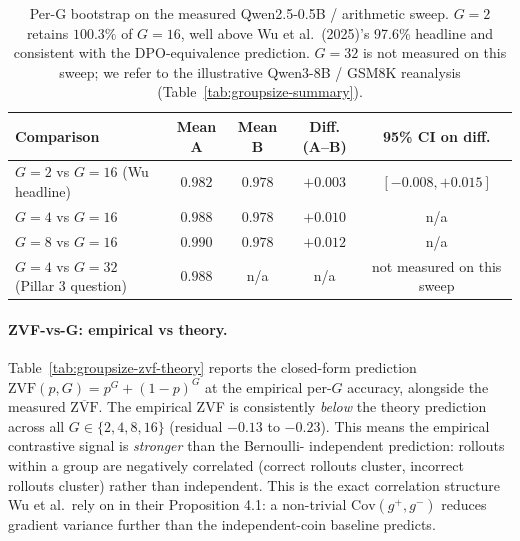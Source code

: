 \begin{table}[htbp]
\centering
\small
\begin{tabular}{lcccc}
\toprule
Comparison & Mean A & Mean B & Diff. (A--B) & 95\% CI on diff. \\
\midrule
$G{=}2$ vs $G{=}16$ (Wu headline)        & $0.982$ & $0.978$ & $+0.003$ & $[-0.008, +0.015]$ \\
$G{=}4$ vs $G{=}16$                      & $0.988$ & $0.978$ & $+0.010$ & n/a                \\
$G{=}8$ vs $G{=}16$                      & $0.990$ & $0.978$ & $+0.012$ & n/a                \\
$G{=}4$ vs $G{=}32$ (Pillar 3 question)  & $0.988$ & n/a     & n/a     & not measured on this sweep \\
\bottomrule
\end{tabular}
\caption{Per-G bootstrap on the measured Qwen2.5-0.5B / arithmetic sweep.
$G{=}2$ retains $100.3\%$ of $G{=}16$, well above Wu et al.\ (2025)'s
97.6\% headline and consistent with the DPO-equivalence prediction.
$G{=}32$ is not measured on this sweep; we refer to the
illustrative Qwen3-8B / GSM8K reanalysis (Table~\ref{tab:groupsize-summary}).}
\label{tab:groupsize-dpo-check}
\end{table}

\paragraph{ZVF-vs-G: empirical vs theory.}
Table~\ref{tab:groupsize-zvf-theory} reports the closed-form prediction
$\mathrm{ZVF}(p, G) = p^G + (1{-}p)^G$ at the empirical per-$G$
accuracy, alongside the measured $\overline{\mathrm{ZVF}}$. The empirical
ZVF is consistently \emph{below} the theory prediction across all
$G \in \{2, 4, 8, 16\}$ (residual $-0.13$ to $-0.23$). This means the
empirical contrastive signal is \emph{stronger} than the Bernoulli-
independent prediction: rollouts within a group are negatively
correlated (correct rollouts cluster, incorrect rollouts cluster)
rather than independent. This is the exact correlation structure
Wu et al.\ rely on in their Proposition 4.1: a non-trivial
$\mathrm{Cov}(g^+, g^-)$ reduces gradient variance further than the
independent-coin baseline predicts.

